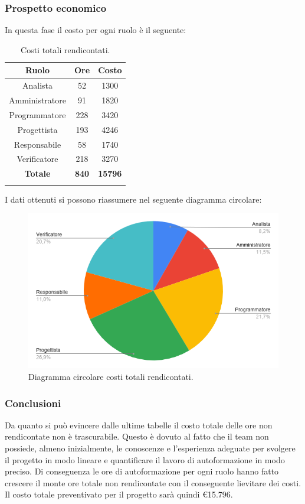 \subsubsection{Prospetto economico}

In questa fase il costo per ogni ruolo è il seguente:
\begin{longtable}{|c|c|c|}
	\hline
	\rowcolor[HTML]{F9CB9C} 
	\textbf{Ruolo} & \textbf{Ore} & \textbf{Costo} \\
	\hline
	Analista &
	52 &
	1300 \\
	\hline
	Amministratore &
	91 &
	1820 \\
	\hline
	Programmatore &
	228 &
	3420 \\
	\hline
	Progettista &
	193 &
	4246 \\
	\hline
	Responsabile &
	58 &
	1740 \\
	\hline
	Verificatore &
	218 &
	3270 \\
	\hline
	\rowcolor[HTML]{F9CB9C} 
	\textbf{Totale} & \textbf{840} & \textbf{15796} \\
	\hline
	\caption{Costi totali rendicontati.}
	\label{fig: Costi totali rendicontati.}
\end{longtable}

I dati ottenuti si possono riassumere nel seguente diagramma circolare:
\begin{figure}[H]
	\centering
	\includegraphics[width=0.6\linewidth]{./res/images/CostiRendicontati.png}
	\caption{Diagramma circolare costi totali rendicontati.}
	\label{fig: Diagramma circolare costi totali rendicontati.}
\end{figure}
			
\subsubsection{Conclusioni}		
Da quanto si può evincere dalle ultime tabelle il costo totale delle ore non rendicontate non è trascurabile. Questo è dovuto al fatto che il team non possiede, almeno inizialmente, le conoscenze e l’esperienza adeguate per svolgere il progetto in modo lineare e quantificare il lavoro di autoformazione in modo preciso. Di conseguenza le ore di autoformazione per ogni ruolo hanno fatto crescere il monte ore totale non rendicontate con il conseguente lievitare dei costi.
\\
Il costo totale preventivato per il progetto sarà quindi €15.796.
